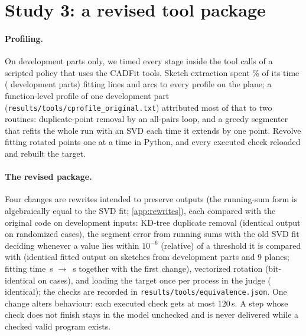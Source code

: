 \section{Study 3: a revised tool package}
\label{sec:tools}

\paragraph{Profiling.} On development parts only, we timed every stage inside the tool calls of a scripted policy that uses the CADFit tools. Sketch extraction spent \eExtractFitShare\% of its time (\eProfileParts{} development parts) fitting lines and arcs to every profile on the plane; a function-level profile of one development part (\texttt{results/tools/cprofile\_original.txt}) attributed most of that to two routines: duplicate-point removal by an all-pairs loop, and a greedy segmenter that refits the whole run with an SVD each time it extends by one point. Revolve fitting rotated points one at a time in Python, and every executed check reloaded and rebuilt the target.

\paragraph{The revised package.} Four changes are rewrites intended to preserve outputs (the running-sum form is algebraically equal to the SVD fit; \cref{app:rewrites}), each compared with the original code on development inputs: KD-tree duplicate removal (identical output on \eDedup{} randomized cases), the segment error from running sums with the old SVD fit deciding whenever a value lies within $10^{-6}$ (relative) of a threshold it is compared with (identical fitted output on \eFit{} sketches from \eFitParts{} development parts and 9 planes; fitting time \eFitOld\,s $\to$ \eFitNew\,s together with the first change), vectorized rotation (bit-identical on \eRotation{} cases), and loading the target once per process in the judge (\eJudge{} identical); the checks are recorded in \texttt{results/tools/equivalence.json}. One change alters behaviour: each executed check gets at most 120\,s. A step whose check does not finish stays in the model unchecked and is never delivered while a checked valid program exists.


